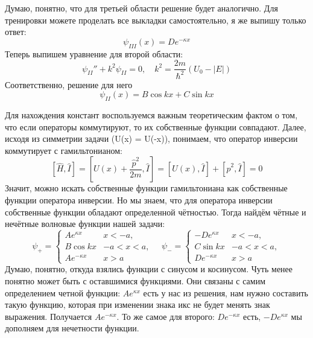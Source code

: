 Думаю, понятно, что для третьей области решение будет аналогично. Для тренировки можете проделать все выкладки самостоятельно, я же выпишу только ответ:
\[
\psi_{III}(x) = De^{-\kappa x}
\]
Теперь выпишем уравнение для второй области:
\[
\psi_{II}'' + k^2\psi_{II} = 0, \quad k^2 = \frac{2m}{\hbar^2}(U_0 - |E|)
\]
Соответственно, решение для него
\[
\psi_{II}(x) = B\cos kx + C\sin kx
\]

Для нахождения констант воспользуемся важным теоретическим фактом о том, что если операторы коммутируют, то их собственные функции совпадают. Далее, исходя из симметрии задачи (U(x) = U(-x)), понимаем, что оператор инверсии коммутирует с гамильтонианом:
\[
[\hat{H}, \hat{I}] = [U(x) + \frac{\hat{p}^2}{2m}, \hat{I}] = [U(x), \hat{I}] + [\hat{p}^2, \hat{I}] = 0
\]
Значит, можно искать собственные функции гамильтониана как собственные функции оператора инверсии. Но мы знаем, что для оператора инверсии собственные функции обладают определенной чётностью. Тогда найдём чётные и нечётные волновые функции нашей задачи:
\[
\psi_+ =
\begin{cases}
    Ae^{\kappa x}& x < -a,\\
    B \cos kx & -a < x < a,\\
    Ae^{-\kappa x}& x > a
\end{cases}\quad
\psi_- =
\begin{cases}
    -De^{\kappa x}& x < -a,\\
    C \sin kx & -a < x < a,\\
    De^{-\kappa x}& x > a
\end{cases}
\]
Думаю, понятно, откуда взялись функции с синусом и косинусом. Чуть менее понятно может быть с оставшимися функциями. Они связаны с самим определением четной функции: $Ae^{\kappa x}$ есть у нас из решения, нам нужно составить такую функцию, которая при изменении знака икс не будет менять знак выражения. Получается $Ae^{-\kappa x}$. То же самое для второго: $De^{-\kappa x}$ есть, $-De^{\kappa x}$ мы дополняем для нечетности функции.

